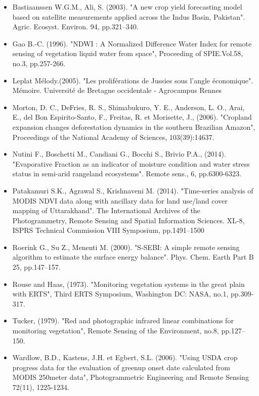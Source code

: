 \documentclass[10pt,a4paper]{article}
\begin{document}
\begin{itemize}
\item Bastiaanssen W.G.M., Ali, S. (2003). "A new crop yield forecasting model based on satellite measurements applied across the Indus Basin, Pakistan". Agric. Ecosyst. Environ. 94, pp.321–340.
\item Gao B.-C. (1996). "NDWI : A  Normalized  Difference  Water  Index  for  remote  sensing  of vegetation liquid water from space", Proceeding of SPIE.Vol.58, no.3, pp.257-266.
\item Leplat Mélody.(2005). "Les proliférations de Jussies sous l'angle économique". Mémoire. Université de Bretagne occidentale - Agrocampus Rennes
\item Morton, D. C., DeFries, R. S., Shimabukuro, Y. E., Anderson, L. O., Arai, E., del Bon Espirito-Santo, F.,  Freitas,  R.  et  Morisette,  J.,  (2006). "Cropland expansion changes deforestation dynamics in the southern Brazilian Amazon", Proceedings of the National Academy of Sciences, 103(39):14637. 
\item Nutini F., Boschetti M., Candiani G., Bocchi S., Brivio P.A., (2014). "Evaporative Fraction as an indicator of moisture condition and water stress status in semi-arid rangeland ecosystems". Remote sens., 6, pp.6300-6323.
\item Patakamuri S.K., Agrawal S., Krishnaveni M. (2014). "Time-series analysis of MODIS NDVI data along with ancillary data for land use/land cover mapping of Uttarakhand". The International Archives of the Photogrammetry, Remote Sensing and Spatial Information Sciences. XL-8, ISPRS Technical Commission VIII Symposium, pp.1491–1500
\item Roerink G., Su Z., Menenti M. (2000). "S-SEBI: A simple remote sensing algorithm to estimate the surface energy balance". Phys. Chem. Earth Part B 25, pp.147–157.
\item Rouse and Haas, (1973). "Monitoring vegetation systems in the great plain with ERTS", Third ERTS Symposium, Washington DC: NASA, no.1, pp.309-317.
\item Tucker, (1979). "Red and photographic infrared linear combinations for monitoring vegetation", Remote Sensing of the Environment, no.8, pp.127–150. 
\item Wardlow, B.D., Kastens, J.H. et Egbert, S.L. (2006). "Using USDA crop progress data for the evaluation of greenup onset date calculated from MODIS 250meter data", Photogrammetric Engineering and Remote Sensing 72(11), 1225-1234. 
\end{itemize}
\end{document}
